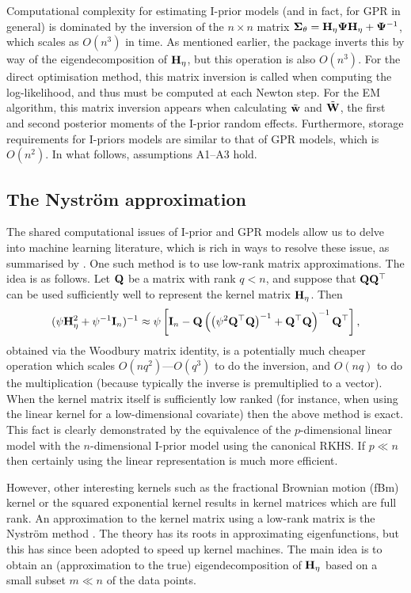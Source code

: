 Computational complexity for estimating I-prior models (and in fact, for GPR in general) is dominated by the inversion of the $n \times n$ matrix ${\bm\Sigma}_\theta = {\mathbf H}_\eta{\bm\Psi}{\mathbf H}_\eta + {\bm\Psi}^{-1}$, which scales as $O(n^3)$ in time.
As mentioned earlier, the  package inverts this by way of the eigendecomposition of ${\mathbf H}_\eta$, but this operation is also $O(n^3)$.
For the direct optimisation method, this matrix inversion is called when computing the log-likelihood, and thus must be computed at each Newton step.
For the EM algorithm, this matrix inversion appears when calculating $\tilde {{\mathbf w}}$ and $\tilde {{\mathbf W}}$, the first and second posterior moments of the I-prior random effects.
Furthermore, storage requirements for I-priors models are similar to that of GPR models, which is $O(n^2)$.
In what follows, assumptions A1--A3 hold.

\subsection[The Nystrom approximation]{The Nyström approximation}

The shared computational issues of I-prior and GPR models allow us to delve into machine learning literature, which is rich in ways to resolve these issue, as summarised by \citet{quinonero2005unifying}.
One such method is to use low-rank matrix approximations.
The idea is as follows.
Let ${\mathbf Q}$ be a matrix with rank $q < n$, and suppose that ${\mathbf Q}{\mathbf Q}^\top$ can be used sufficiently well to represent the kernel matrix ${\mathbf H}_\eta$.
Then
%
\[
  (\psi{\mathbf H}_\eta^2 + \psi^{-1}{\mathbf I}_n)^{-1} \approx
  \psi\left[
  {\mathbf I}_n -
  {\mathbf Q}\left( \big(\psi^2{\mathbf Q}^\top{\mathbf Q}\big)^{-1} +{\mathbf Q}^\top{\mathbf Q} \right)^{-1} {\mathbf Q}^\top
  \right],
\]
%
obtained via the Woodbury matrix identity, is a potentially much cheaper operation which scales $O(nq^2)$---$O(q^3)$ to do the inversion, and $O(nq)$ to do the multiplication (because typically the inverse is premultiplied to a vector).
When the kernel matrix itself is sufficiently low ranked (for instance, when using the linear kernel for a low-dimensional covariate) then the above method is exact.
This fact is clearly demonstrated by the equivalence of the $p$-dimensional linear model  with the $n$-dimensional I-prior model using the canonical RKHS.
If $p \ll n$ then certainly using the linear representation is much more efficient.

However, other interesting kernels such as the fractional Brownian motion (fBm) kernel or the squared exponential kernel results in kernel matrices which are full rank.
An approximation to the kernel matrix using a low-rank matrix is the Nystr\"om method \citep{williams2001using}.
The theory has its roots in approximating eigenfunctions, but this has since been adopted to speed up kernel machines.
The main idea is to obtain an (approximation to the true) eigendecomposition of ${\mathbf H}_\eta$ based on a small subset $m \ll n$ of the data points.

